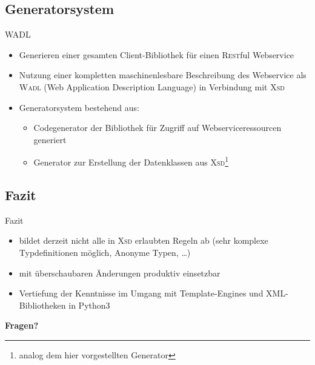 \subsection{Generatorsystem}
\begin{frame}
    \begin{block}{WADL}
        \begin{itemize}
            \item Generieren einer gesamten Client-Bibliothek für einen \textsc{Rest}ful Webservice
            \item Nutzung einer kompletten maschinenlesbare Beschreibung des Webservice als \textsc{Wadl} (Web Application Description Language) in Verbindung mit \textsc{Xsd}
            \item Generatorsystem bestehend aus:
            \begin{itemize}
                \item Codegenerator der Bibliothek für Zugriff auf Webserviceressourcen generiert
                \item Generator zur Erstellung der Datenklassen aus \textsc{Xsd}\footnote{analog dem hier vorgestellten Generator}
            \end{itemize}
        \end{itemize}
    \end{block}
\end{frame}

\subsection{Fazit}
\begin{frame}{Fazit}
    \begin{itemize}
        \item bildet derzeit nicht alle in \textsc{Xsd} erlaubten Regeln ab (sehr komplexe Typdefinitionen möglich, Anonyme Typen, \ldots)
        \item mit überschaubaren Änderungen produktiv einsetzbar
        \item Vertiefung der Kenntnisse im Umgang mit Template-Engines und XML-Bibliotheken in Python3
    \end{itemize}
\end{frame}

\begin{frame}[plain]
    \vspace*{\fill}
        \begin{center}
            \Huge \textbf{Fragen?}
        \end{center}
    \vspace*{\fill}
\end{frame}
